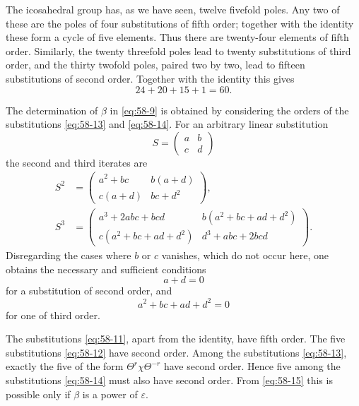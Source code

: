 \documentclass[11pt,a4paper]{article}
\newcommand{\eps}{\varepsilon}
\begin{document}
The icosahedral group has, as we have seen, twelve fivefold poles.  Any two of these are the poles of four substitutions of fifth order; together with the identity these form a cycle of five elements.  Thus there are twenty-four elements of fifth order.  Similarly, the twenty threefold poles lead to twenty substitutions of third order, and the thirty twofold poles, paired two by two, lead to fifteen substitutions of second order.  Together with the identity this gives
\[
 24+20+15+1=60.
\]

The determination of \(\beta\) in \eqref{eq:58-9} is obtained by considering the orders of the substitutions \eqref{eq:58-13} and \eqref{eq:58-14}.  For an arbitrary linear substitution
\[
 S=\begin{pmatrix}a&b\\c&d\end{pmatrix}
\]
the second and third iterates are
\begin{align*}
 S^2&=\begin{pmatrix}a^2+bc&b(a+d)\\c(a+d)&bc+d^2\end{pmatrix},\\
 S^3&=\begin{pmatrix}a^3+2abc+bcd&b(a^2+bc+ad+d^2)\\ c(a^2+bc+ad+d^2)&d^3+abc+2bcd\end{pmatrix}.
\end{align*}
Disregarding the cases where \(b\) or \(c\) vanishes, which do not occur here, one obtains the necessary and sufficient conditions
\begin{equation}\label{eq:58-15}
 a+d=0
\end{equation}
for a substitution of second order, and
\begin{equation}\label{eq:58-16}
 a^2+bc+ad+d^2=0
\end{equation}
for one of third order.

The substitutions \eqref{eq:58-11}, apart from the identity, have fifth order.  The five substitutions \eqref{eq:58-12} have second order.  Among the substitutions \eqref{eq:58-13}, exactly the five of the form \(\Theta^r\chi\Theta^{-r}\) have second order.  Hence five among the substitutions \eqref{eq:58-14} must also have second order.  From \eqref{eq:58-15} this is possible only if \(\beta\) is a power of \(\eps\).
\end{document}
